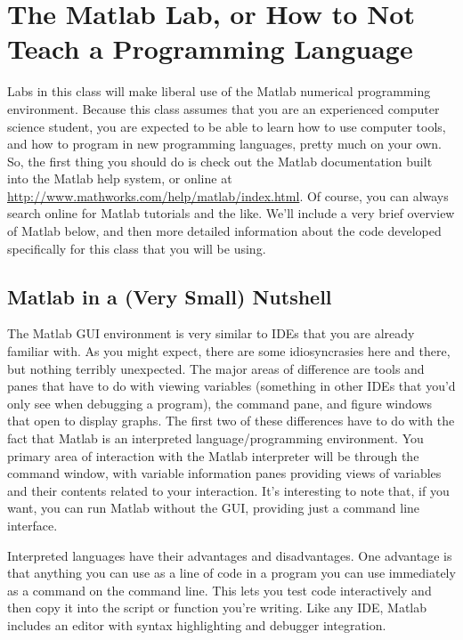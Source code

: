 
\section{The Matlab Lab, or How to Not Teach a Programming Language}

Labs in this class will make liberal use of the Matlab numerical
programming environment. Because this class assumes that you are an
experienced computer science student, you are expected to be able to
learn how to use computer tools, and how to program in new programming
languages, pretty much on your own. So, the first thing you should do
is check out the Matlab documentation built into the Matlab help
system, or online at
\url{http://www.mathworks.com/help/matlab/index.html}. Of course, you
can always search online for Matlab tutorials and the like. We'll
include a very brief overview of Matlab below, and then more detailed
information about the code developed specifically for this class that
you will be using.

\subsection{Matlab in a (Very Small) Nutshell}
\label{sc:basic-matlab}

The Matlab GUI environment is very similar to IDEs that you are
already familiar with. As you might expect, there are some
idiosyncrasies here and there, but nothing terribly unexpected. The
major areas of difference are tools and panes that have to do with
viewing variables (something in other IDEs that you'd only see when
debugging a program), the command pane, and figure windows that open
to display graphs. The first two of these differences have to do with
the fact that Matlab is an interpreted language/programming
environment. You primary area of interaction with the Matlab
interpreter will be through the command window, with variable
information panes providing views of variables and their contents
related to your interaction. It's interesting to note that, if you
want, you can run Matlab without the GUI, providing just a command
line interface.

Interpreted languages have their advantages and disadvantages.  One
advantage is that anything you can use as a line of code in a program
you can use immediately as a command on the command line. This lets
you test code interactively and then copy it into the script or
function you're writing. Like any IDE, Matlab includes an editor with
syntax highlighting and debugger integration.

